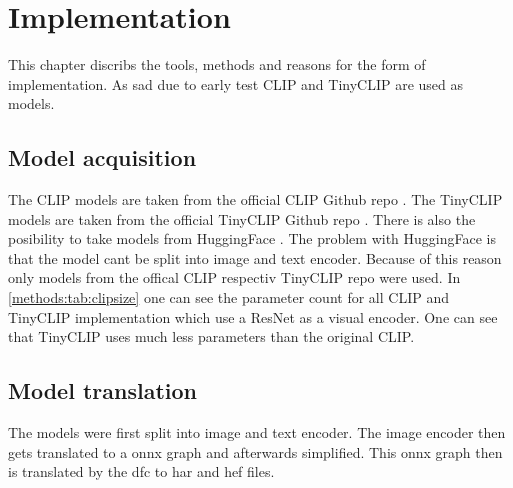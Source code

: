 \chapter{Implementation
    \label{chapter:implementation}}

This chapter discribs the tools, methods and reasons for the form of implementation.
As sad due to early test CLIP and TinyCLIP are used as models.

\section{Model acquisition}

The CLIP models are taken from the official CLIP Github repo \cite{clipgit}.
The TinyCLIP models are taken from the official TinyCLIP Github repo \cite{tinyclipgit}.
There is also the posibility to take models from HuggingFace \cite{huggingface}.
The problem with HuggingFace is that the model cant be split into image and text encoder.
Because of this reason only models from the offical CLIP respectiv TinyCLIP repo were used.
In \cref{methods:tab:clipsize} one can see the parameter count for all CLIP and TinyCLIP implementation which use a ResNet as a visual encoder.
One can see that TinyCLIP uses much less parameters than the original CLIP.


\section{Model translation
\label{implementation:sec:translation}}
The models were first split into image and text encoder.
The image encoder then gets translated to a onnx graph and afterwards simplified.
This onnx graph then is translated by the \acrshort{dfc} to \acrshort{har} and \acrshort{hef} files.

